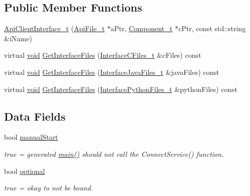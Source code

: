 \subsection*{Public Member Functions}
\begin{DoxyCompactItemize}
\item 
\hyperlink{struct_api_client_interface__t_a3faef690b34f5e84ae0de81a7771ef0b}{Api\+Client\+Interface\+\_\+t} (\hyperlink{struct_api_file__t}{Api\+File\+\_\+t} $\ast$a\+Ptr, \hyperlink{struct_component__t}{Component\+\_\+t} $\ast$c\+Ptr, const std\+::string \&i\+Name)
\item 
virtual \hyperlink{_t_e_m_p_l_a_t_e__cdef_8h_ac9c84fa68bbad002983e35ce3663c686}{void} \hyperlink{struct_api_client_interface__t_ac7b58b2ad7cfb696d7a91bbca4bd3fce}{Get\+Interface\+Files} (\hyperlink{struct_interface_c_files__t}{Interface\+C\+Files\+\_\+t} \&c\+Files) const 
\item 
virtual \hyperlink{_t_e_m_p_l_a_t_e__cdef_8h_ac9c84fa68bbad002983e35ce3663c686}{void} \hyperlink{struct_api_client_interface__t_a1d71aac9fbc8584ca3951b9e7168080b}{Get\+Interface\+Files} (\hyperlink{struct_interface_java_files__t}{Interface\+Java\+Files\+\_\+t} \&java\+Files) const 
\item 
virtual \hyperlink{_t_e_m_p_l_a_t_e__cdef_8h_ac9c84fa68bbad002983e35ce3663c686}{void} \hyperlink{struct_api_client_interface__t_a2270e3cb0d0d876db1d7af35403bfe5f}{Get\+Interface\+Files} (\hyperlink{struct_interface_python_files__t}{Interface\+Python\+Files\+\_\+t} \&python\+Files) const 
\end{DoxyCompactItemize}
\subsection*{Data Fields}
\begin{DoxyCompactItemize}
\item 
bool \hyperlink{struct_api_client_interface__t_aee1c08e7349b35d70c226950a63810eb}{manual\+Start}
\begin{DoxyCompactList}\small\item\em true = generated \hyperlink{start_8c_a3c04138a5bfe5d72780bb7e82a18e627}{main()} should not call the Connect\+Service() function. \end{DoxyCompactList}\item 
bool \hyperlink{struct_api_client_interface__t_a6b594657880bf7b449f6a212a90f2e1d}{optional}
\begin{DoxyCompactList}\small\item\em true = okay to not be bound. \end{DoxyCompactList}\end{DoxyCompactItemize}
